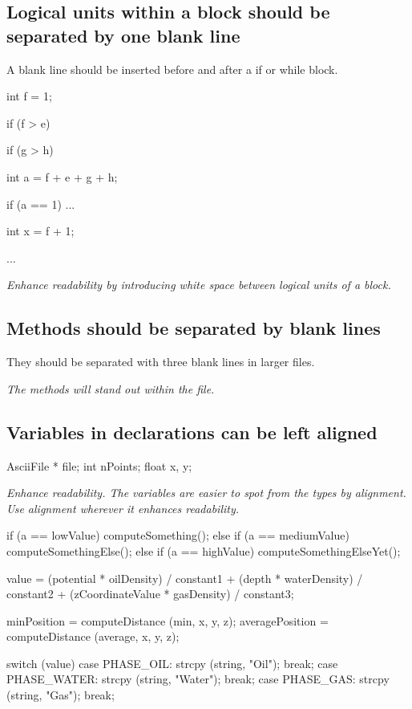 \documentclass[a4paper,11pt,oneside]{scrbook}
\newcommand{\guideline}[1]{{\subsection{#1}}}
\newcommand{\motivation}[1]{{\normalfont \itshape #1}}
\newcommand{\trcode}[1]{{\normalfont \ttfamily #1}}
\begin{document}
\guideline{Logical units within a block should be separated by one blank line}

A blank line should be inserted before and after a \trcode{if} or \trcode{while}
block.

\begin{code}
  int f = 1;

  if (f > e) {
    if (g > h) {
      int a = f + e + g + h;

      if (a == 1) {
        ...
      }
    }

    int x = f + 1;

    ...
  }
\end{code}

\motivation{
  Enhance readability by introducing white space between logical units of a block.
}

\guideline{Methods should be separated by blank lines}

They should be separated with three blank lines in larger files.

\motivation{
  The methods will stand out within the file.
}

\guideline{Variables in declarations can be left aligned}

\begin{code}
  AsciiFile *  file;
  int          nPoints;
  float        x, y;
\end{code}

\motivation{
  Enhance readability. The variables are easier to spot from the types by alignment.
  Use alignment wherever it enhances readability. 
}

\begin{code}
  if      (a == lowValue)    computeSomething();
  else if (a == mediumValue) computeSomethingElse();
  else if (a == highValue)   computeSomethingElseYet();

  value = (potential        * oilDensity)   / constant1 +
          (depth            * waterDensity) / constant2 +
          (zCoordinateValue * gasDensity)   / constant3;

  minPosition     = computeDistance (min,     x, y, z);
  averagePosition = computeDistance (average, x, y, z);

  switch (value) {
    case PHASE_OIL:   strcpy (string, "Oil");   break;
    case PHASE_WATER: strcpy (string, "Water"); break;
    case PHASE_GAS:   strcpy (string, "Gas");   break;
  } 
\end{code}
\end{document}
